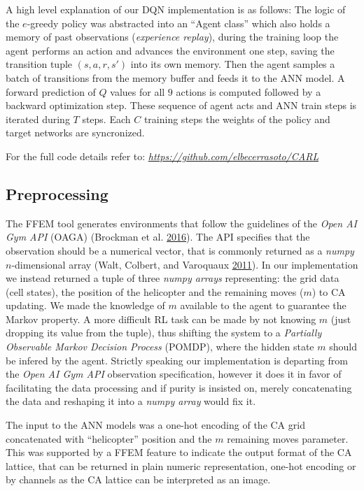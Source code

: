 \documentclass[
  openany]{book}
\begin{document}
A high level explanation of our DQN implementation is as follows: The logic of the \(e\)-greedy policy was abstracted into an ``Agent class'' which also holds a memory of past observations (\emph{experience replay}), during the training loop the agent performs an action and advances the environment one step, saving the transition tuple \((s,a,r,s')\) into its own memory. Then the agent samples a batch of transitions from the memory buffer and feeds it to the ANN model. A forward prediction of \(Q\) values for all \(9\) actions is computed followed by a backward optimization step. These sequence of agent acts and ANN train steps is iterated during \(T\) steps. Each \(C\) training steps the weights of the policy and target networks are syncronized.

For the full code details refer to: \emph{\url{https://github.com/elbecerrasoto/CARL}}

\hypertarget{preprocessing}{%
\subsection{Preprocessing}\label{preprocessing}}

The FFEM tool generates environments that follow the guidelines of the \emph{Open AI Gym API} (OAGA) (Brockman et al. \protect\hyperlink{ref-1606.01540}{2016}). The API specifies that the observation should be a numerical vector, that is commonly returned as a \emph{numpy} \(n\)-dimensional array (Walt, Colbert, and Varoquaux \protect\hyperlink{ref-walt2011numpy}{2011}). In our implementation we instead returned a tuple of three \emph{numpy arrays} representing: the grid data (cell states), the position of the helicopter and the remaining moves (\(m\)) to CA updating. We made the knowledge of \(m\) available to the agent to guarantee the Markov property. A more difficult RL task can be made by not knowing \(m\) (just dropping its value from the tuple), thus shifting the system to a \emph{Partially Observable Markov Decision Process} (POMDP), where the hidden state \(m\) should be infered by the agent. Strictly speaking our implementation is departing from the \emph{Open AI Gym API} observation specification, however it does it in favor of facilitating the data processing and if purity is insisted on, merely concatenating the data and reshaping it into a \emph{numpy array} would fix it.

The input to the ANN models was a one-hot encoding of the CA grid concatenated with ``helicopter'' position and the \(m\) remaining moves parameter. This was supported by a FFEM feature to indicate the output format of the CA lattice, that can be returned in plain numeric representation, one-hot encoding or by channels as the CA lattice can be interpreted as an image.
\end{document}
